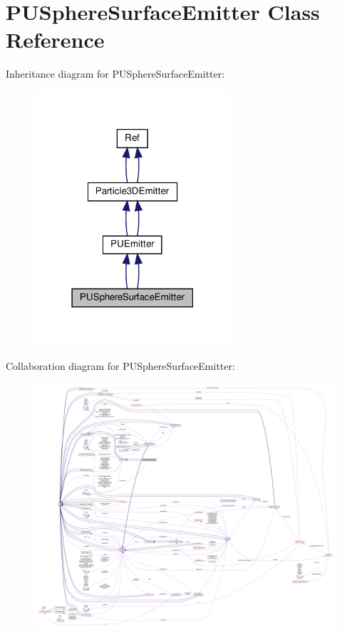 \hypertarget{classPUSphereSurfaceEmitter}{}\section{P\+U\+Sphere\+Surface\+Emitter Class Reference}
\label{classPUSphereSurfaceEmitter}


Inheritance diagram for P\+U\+Sphere\+Surface\+Emitter\+:
\nopagebreak
\begin{figure}[H]
\begin{center}
\leavevmode
\includegraphics[width=207pt]{classPUSphereSurfaceEmitter__inherit__graph}
\end{center}
\end{figure}


Collaboration diagram for P\+U\+Sphere\+Surface\+Emitter\+:
\nopagebreak
\begin{figure}[H]
\begin{center}
\leavevmode
\includegraphics[width=350pt]{classPUSphereSurfaceEmitter__coll__graph}
\end{center}
\end{figure}
